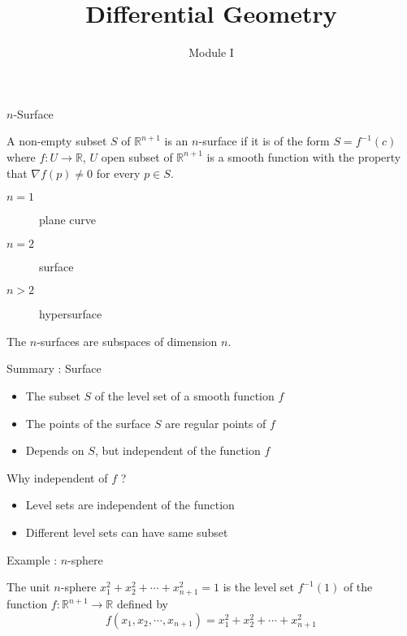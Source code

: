 \documentclass{beamer}
\title{Differential Geometry}
\author{Module I}
\institute{Chapter 4 : Surfaces}
\begin{document}
\begin{frame}
\maketitle
\end{frame}

\begin{frame}{$n$-Surface}
\begin{definition}[$n$-Surface]
	A non-empty subset $S$ of $\mathbb{R}^{n+1}$ is an $n$-surface if it is of the form $S = f^{-1}(c)$ where $f : U \to \mathbb{R}$, $U$ open subset of $\mathbb{R}^{n+1}$ is a smooth function with the property that $\nabla f(p) \ne 0$ for every $p \in S$.
\end{definition}
\begin{description}
	\item[$n=1$] plane curve
	\item[$n=2$] surface
	\item[$n>2$] hypersurface
\end{description}
The $n$-surfaces are subspaces of dimension $n$.
\end{frame}

\begin{frame}{Summary : Surface}
\begin{definition}[Surface]
\begin{itemize}
	\item The subset $S$ of the level set of a smooth function $f$
	\item The points of the surface $S$ are regular points of $f$
	\item Depends on $S$, but independent of the function $f$
\end{itemize}
\end{definition}
\begin{block}{Why independent of $f$ ?}
\begin{itemize}
	\item Level sets are independent of the function
	\item Different level sets can have same subset
\end{itemize}
\end{block}
\end{frame}

\begin{frame}{Example : $n$-sphere}
\begin{definition}[$n$-sphere]
	The unit $n$-sphere $x_1^2 + x_2^2 + \cdots + x_{n+1}^2 = 1$ is the level set $f^{-1}(1)$ of the function $f:\mathbb{R}^{n+1} \to \mathbb{R}$ defined by
\begin{equation}
	f(x_1,x_2,\cdots,x_{n+1}) = x_1^2+x_2^2+\cdots+x_{n+1}^2
\end{equation}
\end{definition}
\end{frame}
\end{document}
